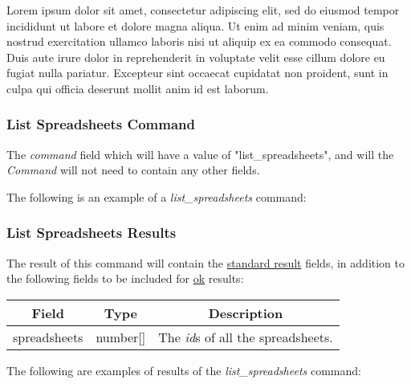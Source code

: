 Lorem ipsum dolor sit amet, consectetur adipiscing elit, sed do eiusmod tempor incididunt ut labore et dolore magna aliqua. Ut enim ad minim veniam, quis nostrud exercitation ullamco laboris nisi ut aliquip ex ea commodo consequat. Duis aute irure dolor in reprehenderit in voluptate velit esse cillum dolore eu fugiat nulla pariatur. Excepteur sint occaecat cupidatat non proident, sunt in culpa qui officia deserunt mollit anim id est laborum.

\subsubsection{List Spreadsheets Command}
The \emph{command} field which will have a value of "list\_spreadsheets", and will the \emph{Command} will not need to contain any other fields.

The following is an example of a \emph{list\_spreadsheets} command:


\subsubsection{List Spreadsheets Results}
The result of this command will contain the \hyperref[sec:message:result]{standard result} fields, in addition to the following fields to be included for \underline{ok} results:
\begin{table}[H]
    \begin{center}
        \begin{tabular}{|c|c|c|}\hline
            Field & Type & Description \\\hline
            spreadsheets & number[] & The \emph{id}s of all the spreadsheets. \\\hline
        \end{tabular}
    \end{center}
\end{table}

The following are examples of results of the \emph{list\_spreadsheets} command:




